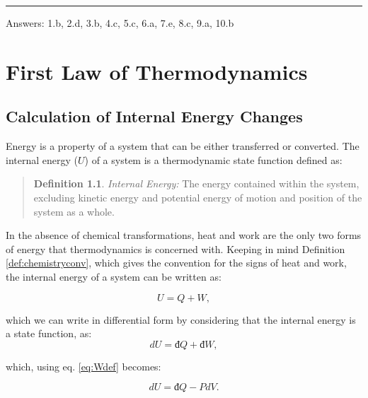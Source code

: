 \documentclass[
  9pt,
]{extbook}
\theoremstyle{definition}
\newtheorem{definition}{Definition}[chapter]
\theoremstyle{definition}
\theoremstyle{definition}
\theoremstyle{remark}
\begin{document}
\begin{center}\rule{0.5\linewidth}{0.5pt}\end{center}

Answers: 1.b, 2.d, 3.b, 4.c, 5.c, 6.a, 7.e, 8.c, 9.a, 10.b

\hypertarget{FirstLaw}{%
\chapter{First Law of Thermodynamics}\label{FirstLaw}}

\hypertarget{energyint}{%
\section{Calculation of Internal Energy Changes}\label{energyint}}

Energy is a property of a system that can be either transferred or converted. The internal energy (\(U\)) of a system is a thermodynamic state function defined as:

\begin{quote}
\begin{definition}
\protect\hypertarget{def:energy}{}{\label{def:energy} }\emph{Internal Energy:} The energy contained within the system, excluding kinetic energy and potential energy of motion and position of the system as a whole.
\end{definition}
\end{quote}

In the absence of chemical transformations, heat and work are the only two forms of energy that thermodynamics is concerned with. Keeping in mind Definition \ref{def:chemistryconv}, which gives the convention for the signs of heat and work, the internal energy of a system can be written as:

\begin{equation}
  U = Q + W,
  \label{eq:U}
\end{equation}

which we can write in differential form by considering that the internal energy is a state function, as:
\begin{equation}
  dU = đ Q + đ W,
  \label{eq:dU}
\end{equation}

which, using eq. \eqref{eq:Wdef} becomes:

\begin{equation}
  dU = đ Q - PdV.
  \label{eq:dUpdv}
\end{equation}
\end{document}
